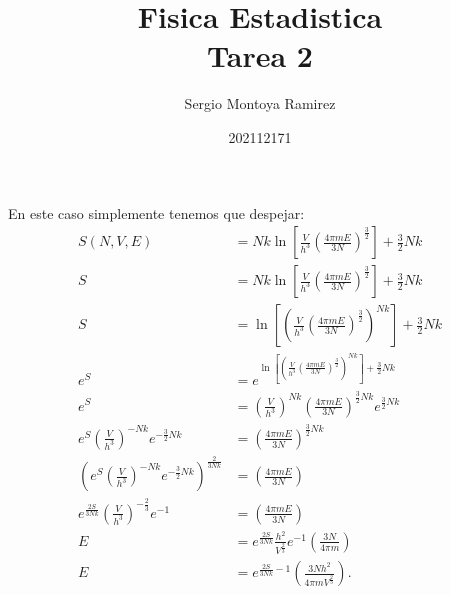 \documentclass{report}
\title{\Huge{Fisica Estadistica}\\Tarea 2}
\author{\huge{Sergio Montoya Ramirez}}
\date{202112171}
\begin{document}
\maketitle
\newpage%
\tableofcontents
\pagebreak

\chapter{}

\section{}

En este caso simplemente tenemos que despejar:
\begin{align*}
  S\left(N, V, E\right) &= Nk\ln\left[\frac{V}{h^3}\left(\frac{4 \pi m E}{3N}\right)^{\frac{3}{2}}\right] + \frac{3}{2}Nk \\
  S &= Nk\ln\left[\frac{V}{h^3}\left(\frac{4 \pi m E}{3N}\right)^{\frac{3}{2}}\right] + \frac{3}{2}Nk \\
  S &= \ln\left[\left(\frac{V}{h^3}\left(\frac{4 \pi m E}{3N}\right)^{\frac{3}{2}}\right)^{Nk}\right] + \frac{3}{2}Nk \\
  e^{S} &= e^{\ln\left[\left(\frac{V}{h^3}\left(\frac{4 \pi m E}{3N}\right)^{\frac{3}{2}}\right)^{Nk}\right] + \frac{3}{2}Nk} \\
  e^{S} &= \left(\frac{V}{h^3}\right)^{Nk}\left(\frac{4 \pi m E}{3N}\right)^{\frac{3}{2}Nk} e^{\frac{3}{2}Nk} \\
  e^{S} \left(\frac{V}{h^3}\right)^{-Nk} e^{-\frac{3}{2}Nk} &= \left(\frac{4 \pi m E}{3N}\right)^{\frac{3}{2}Nk} \\
  \left(e^{S} \left(\frac{V}{h^3}\right)^{-Nk} e^{-\frac{3}{2}Nk}\right)^{\frac{2}{3Nk}} &= \left(\frac{4 \pi m E}{3N}\right) \\
  e^{\frac{2S}{3Nk}} \left(\frac{V}{h^3}\right)^{-\frac{2}{3}} e^{-1} &= \left(\frac{4 \pi m E}{3N}\right) \\
  E &= e^{\frac{2S}{3Nk}} \frac{h^2}{V^{\frac{2}{3}}} e^{-1} \left(\frac{3N}{4 \pi m}\right) \\
  E &= e^{\frac{2S}{3Nk} -1} \left(\frac{3Nh^2}{4 \pi m V^{\frac{2}{3}}}\right)
.\end{align*}

\section{}
\end{document}
